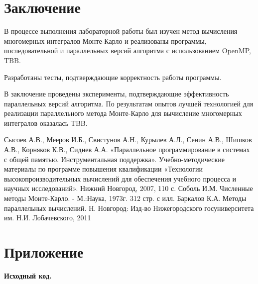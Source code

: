 \documentclass{report}
\begin{document}
\section*{Заключение}
В процессе выполнения лабораторной работы был изучен метод вычисления многомерных интегралов Монте-Карло и реализованы программы, последовательной и параллельных версий алгоритма с использованием OpenMP, TBB.
\par Разработаны тесты, подтверждающие корректность работы программы.
\par В заключение проведены эксперименты, подтверждающие эффективность параллельных версий алгоритма. По результатам опытов лучшей технологией для реализации параллельного метода Монте-Карло для вычисление многомерных интегралов оказалась TBB.
\newpage

\begin{thebibliography}{1}
 Сысоев А.В., Мееров И.Б., Свистунов А.Н., Курылев А.Л., Сенин А.В., Шишков А.В., Корняков К.В., Сиднев А.А. «Параллельное программирование в системах с общей памятью. Инструментальная поддержка». Учебно-методические материалы по программе повышения квалификации «Технологии высокопроизводительных вычислений для обеспечения учебного процесса и научных исследований». Нижний Новгород, 2007, 110 с. 
 Соболь И.М. Численные методы Монте-Карло. - М.:Наука, 1973г. 312 стр. с илл.
 Баркалов К.А. Методы параллельных вычислений. Н. Новгород: Изд-во Нижегородского госуниверситета им. Н.И. Лобачевского, 2011
\end{thebibliography}
\newpage

\section*{Приложение}
\centerline{\bfseries Исходный код.} 








\end{document}
